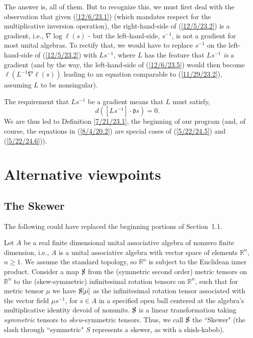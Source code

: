 \documentclass{amsart}
\numberwithin{equation}{section}
\theoremstyle{definition}
\numberwithin{theorem}{section}
\begin{document}
The answer is, all of them.  But to recognize this, we must first deal with the observation that given (\ref{12/6/23.1}) (which mandates respect for the multiplicative inversion operation), the right-hand-side of (\ref{12/5/23.2}) is a gradient, i.e., $\nabla\log \ell(s)$ - but the left-hand-side, $s^{-1}$, is not a gradient for most unital algebras.  
To rectify that, we would have to replace $s^{-1}$ on the left-hand-side of (\ref{12/5/23.2}) with $Ls^{-1}$, where $L$ has the feature that $Ls^{-1}$ {\it is} a gradient (and by the way, the left-hand-side of (\ref{12/6/23.5}) would then become $\ell(L^{-1}\nabla\ell(s))$ leading to an equation comparable to  (\ref{11/29/23.2}), assuming $L$ to be nonsingular).   


The requirement that $Ls^{-1}$ be a gradient means that $L$ must satisfy, \[ d([Ls^{-1}]\cdot \mathfrak{d}s) = 0.\]  We are thus led to Definition \ref{7/21/23.1}, the beginning of our program (and, of course, the equations in (\ref{8/4/20.2}) are special cases of (\ref{5/22/24.5}) and (\ref{5/22/24.6})).

\vspace{1cm}

\section{Alternative viewpoints}

\subsection{The Skewer} 
The following could have replaced the beginning portions of \mbox{Section 1.1}.

  Let $A$ be a real finite dimensional unital associative algebra of nonzero finite dimension, i.e., $A$ is a unital associative algebra with vector space of elements $\mathbb{R}^n$, $n\ge 1$. We assume the standard topology, so $\mathbb{R}^n$ is subject to the Euclidean inner product.  Consider a map $\slashed{\text{S}}$ from the (symmetric second order) metric tensors on $\mathbb{R}^n$ to the (skew-symmetric) infinitesimal rotation tensors on $\mathbb{R}^n$, such that for metric tensor $\mu$ we have $\slashed{\text{S}}[\mu]$ as the infinitesimal rotation tensor associated with the vector field $\mu s^{-1}$, for $s\in A$ in a specified open ball centered at the algebra's multiplicative identity devoid of nonunits.  $\slashed{\text{S}}$ is a linear transformation taking {\it symmetric} tensors to {\it skew}-symmetric tensors. Thus, we call $\slashed{\text{S}}$ the ``Skewer" (the slash through ``symmetric" $S$ represents a skewer, as with a shish-kabob).  
\end{document}
